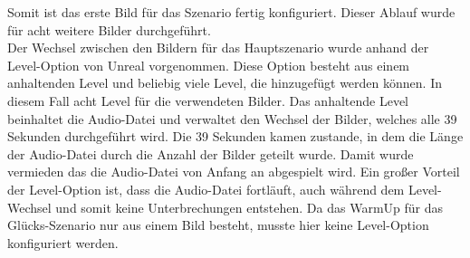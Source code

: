 Somit ist das erste Bild f{\"u}r das Szenario fertig konfiguriert. 
Dieser Ablauf wurde f{\"u}r acht weitere Bilder durchgef{\"u}hrt. \\

Der Wechsel zwischen den Bildern f{\"u}r das Hauptszenario wurde anhand der Level-Option von Unreal vorgenommen. 
Diese Option besteht aus einem anhaltenden Level und beliebig viele Level, die hinzugef{\"u}gt werden k{\"o}nnen. 
In diesem Fall acht Level f{\"u}r die verwendeten Bilder. 
Das anhaltende Level beinhaltet die Audio-Datei und verwaltet den Wechsel der Bilder, welches alle 39 Sekunden durchgef{\"u}hrt wird. Die 39 Sekunden kamen zustande, in dem die L{\"a}nge der Audio-Datei durch die Anzahl der Bilder geteilt wurde. 
Damit wurde vermieden das die Audio-Datei von Anfang an abgespielt wird. 
Ein gro{\ss}er Vorteil der Level-Option ist, dass die Audio-Datei fortl{\"a}uft, auch w{\"a}hrend dem Level-Wechsel und somit keine Unterbrechungen entstehen. 
Da das WarmUp f{\"u}r das Gl{\"u}cks-Szenario nur aus einem Bild besteht, musste hier keine Level-Option konfiguriert werden. \\

